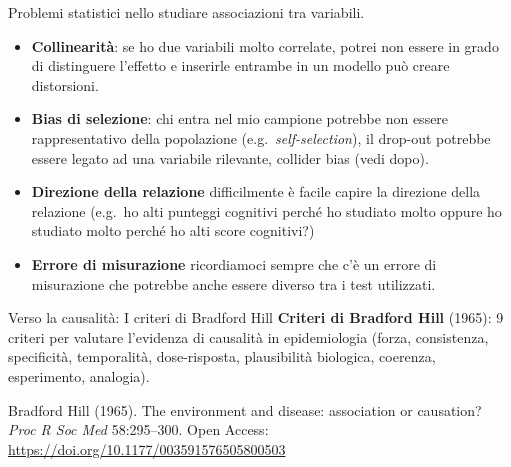 \documentclass[
  ignorenonframetext,
]{beamer}
\begin{document}
\begin{frame}{Problemi statistici nello studiare associazioni tra
variabili.}
\label{problemi-statistici-nello-studiare-associazioni-tra-variabili.}
\small

\begin{itemize}
\item
  \textbf{Collinearità}: se ho due variabili molto correlate, potrei non
  essere in grado di distinguere l'effetto e inserirle entrambe in un
  modello può creare distorsioni.
\item
  \textbf{Bias di selezione}: chi entra nel mio campione potrebbe non
  essere rappresentativo della popolazione (e.g.~\emph{self-selection}),
  il drop-out potrebbe essere legato ad una variabile rilevante,
  collider bias (vedi dopo).
\item
  \textbf{Direzione della relazione} difficilmente è facile capire la
  direzione della relazione (e.g.~ho alti punteggi cognitivi perché ho
  studiato molto oppure ho studiato molto perché ho alti score
  cognitivi?)
\item
  \textbf{Errore di misurazione} ricordiamoci sempre che c'è un errore
  di misurazione che potrebbe anche essere diverso tra i test
  utilizzati.
\end{itemize}
\end{frame}

\begin{frame}{Verso la causalità: I criteri di Bradford Hill}
\label{verso-la-causalituxe0-i-criteri-di-bradford-hill}
\textbf{Criteri di Bradford Hill} (1965): 9 criteri per valutare
l'evidenza di causalità in epidemiologia (forza, consistenza,
specificità, temporalità, dose-risposta, plausibilità biologica,
coerenza, esperimento, analogia).

\vspace{0.2em}

\tiny Bradford Hill (1965). The environment and disease: association or
causation? \emph{Proc R Soc Med} 58:295--300. Open Access:
\url{https://doi.org/10.1177/003591576505800503}
\end{frame}
\end{document}
